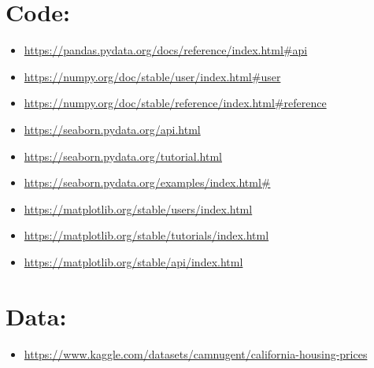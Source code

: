\documentclass{article}
\begin{document}
\section{Code:}
\begin{itemize}
    \item \href{https://pandas.pydata.org/docs/reference/index.html#api}{https://pandas.pydata.org/docs/reference/index.html\#api}
    \item \href{https://numpy.org/doc/stable/user/index.html#user}{https://numpy.org/doc/stable/user/index.html\#user}
    \item \href{https://numpy.org/doc/stable/reference/index.html#reference}{https://numpy.org/doc/stable/reference/index.html\#reference}
    \item \href{https://seaborn.pydata.org/api.html}{https://seaborn.pydata.org/api.html}
    \item \href{https://seaborn.pydata.org/tutorial.html}{https://seaborn.pydata.org/tutorial.html}
    \item \href{https://seaborn.pydata.org/examples/index.html#}{https://seaborn.pydata.org/examples/index.html\#}
    \item \href{https://matplotlib.org/stable/users/index.html}{https://matplotlib.org/stable/users/index.html}
    \item \href{https://matplotlib.org/stable/tutorials/index.html}{https://matplotlib.org/stable/tutorials/index.html}
    \item \href{https://matplotlib.org/stable/api/index.html}{https://matplotlib.org/stable/api/index.html}
\end{itemize}

\section{Data:}
\begin{itemize}
    \item \href{https://www.kaggle.com/datasets/camnugent/california-housing-prices}{https://www.kaggle.com/datasets/camnugent/california-housing-prices}
\end{itemize}
\end{document}
